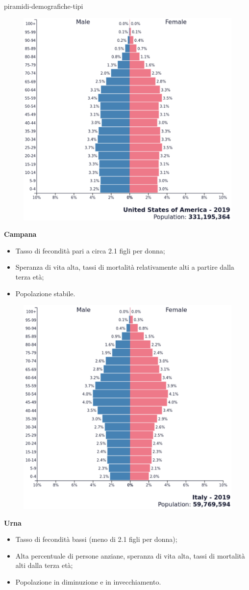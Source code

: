 \documentclass[preview]{standalone}
\begin{document}
\begin{snippet}{piramidi-demografiche-tipi}
    \setlength{\intextsep}{0pt}%
    \begin{figure}
        \includegraphics[width=.35\textwidth]{resources/campana-demografica.png}
        \vspace{-0.5cm}
    \end{figure}
    \textbf{Campana}

    \begin{itemize}
        \item Tasso di fecondità pari a circa 2.1 figli per donna;
        \item Speranza di vita alta, tassi di mortalità relativamente alti a partire dalla terza età;
        \item Popolazione stabile.
    \end{itemize}
    \wrapfill

    \setlength{\intextsep}{0pt}%
    \begin{figure}
        \includegraphics[width=.35\textwidth]{resources/urna-demografica.png}
        \vspace{-0.5cm}
    \end{figure}
    \textbf{Urna}

    \begin{itemize}
        \item Tasso di fecondità bassi (meno di 2.1 figli per donna);
        \item Alta percentuale di persone anziane, speranza di vita alta, tassi di mortalità alti
            dalla terza età;
        \item Popolazione in diminuzione e in invecchiamento.
    \end{itemize}
    \wrapfill
\end{snippet}
\end{document}
